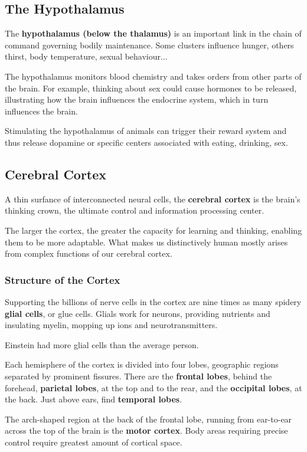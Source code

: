 \documentclass[12pt]{article}
\begin{document}
\subsection{The Hypothalamus}
The {\bf hypothalamus (below the thalamus)} is an important link in the chain of command governing bodily maintenance. Some clusters influence hunger, others thirst, body temperature, sexual behaviour...

The hypothalamus monitors blood chemistry and takes orders from other parts of the brain. For example, thinking about sex could cause hormones to be released, illustrating how the brain influences the endocrine system, which in turn influences the brain.

Stimulating the hypothalamus of animals can trigger their reward system and thus release dopamine or specific centers associated with eating, drinking, sex.

\subsection*{Cerebral Cortex}
A thin surfance of interconnected neural cells, the {\bf cerebral cortex} is the brain's thinking crown, the ultimate control and information processing center. 

The larger the cortex, the greater the capacity for learning and thinking, enabling them to be more adaptable. What makes us distinctively human mostly arises from complex functions of our cerebral cortex.

\subsubsection*{Structure of the Cortex}
Supporting the billions of nerve cells in the cortex are nine times as many spidery \textbf{glial cells}, or glue cells. Glials work for neurons, providing nutrients and insulating myelin, mopping up ions and neurotransmitters.

Einstein had more glial cells than the average person.

Each hemisphere of the cortex is divided into four lobes, geographic regions separated by prominent fissures. There are the \textbf{frontal lobes}, behind the forehead, \textbf{parietal lobes}, at the top and to the rear, and the \textbf{occipital lobes}, at the back. Just above ears, find \textbf{temporal lobes}. 

The arch-shaped region at the back of the frontal lobe, running from ear-to-ear across the top of the brain is the \textbf{motor cortex}. Body areas requiring precise control require greatest amount of cortical space.
\end{document}
